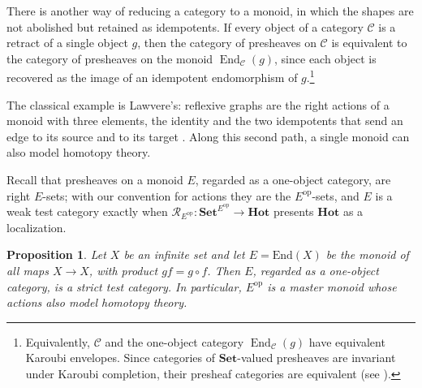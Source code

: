 \documentclass[11pt]{amsart}
\newtheorem{proposition}[teo]{Proposition}
\theoremstyle{definition}
\theoremstyle{remark}
\numberwithin{figure}{section}%
\newcommand{\Set}{\mathbf{Set}}
\newcommand{\Hot}{\mathbf{Hot}}
\newcommand{\op}{\mathrm{op}}
\begin{document}
There is another way of reducing a category to a monoid, in which the shapes are not abolished but retained as idempotents. If every object of a category $\mathcal C$ is a retract of a single object $g$, then the category of presheaves on $\mathcal C$ is equivalent to the category of presheaves on the monoid $\operatorname{End}_{\mathcal C}(g)$, since each object is recovered as the image of an idempotent endomorphism of $g$.\footnote{Equivalently, $\mathcal C$ and the one-object category $\operatorname{End}_{\mathcal C}(g)$ have equivalent Karoubi envelopes. Since categories of $\mathbf{Set}$-valued presheaves are invariant under Karoubi completion, their presheaf categories are equivalent (see \cite[Theorem~1]{BorceuxDejean1986}).}

The classical example is Lawvere's: reflexive graphs are the right actions of a monoid with three elements, the identity and the two idempotents that send an edge to its source and to its target \cite{LawvereGraphs}. Along this second path, a single monoid can also model homotopy theory.

Recall that presheaves on a monoid $E$, regarded as a one-object category, are right $E$-sets; with our convention for actions they are the $E^{\op}$-sets, and $E$ is a weak test category exactly when $\mathcal R_{E^{\op}}\colon\Set^{E^{\op}}\to\Hot$ presents $\Hot$ as a localization.

\begin{proposition}\label{prop:test-monoid}
Let $X$ be an infinite set and let $E=\mathrm{End}(X)$ be the monoid of all maps $X\to X$, with product $gf=g\circ f$. Then $E$, regarded as a one-object category, is a strict test category. In particular, $E^{\op}$ is a master monoid whose actions also model homotopy theory.
\end{proposition}
\end{document}

